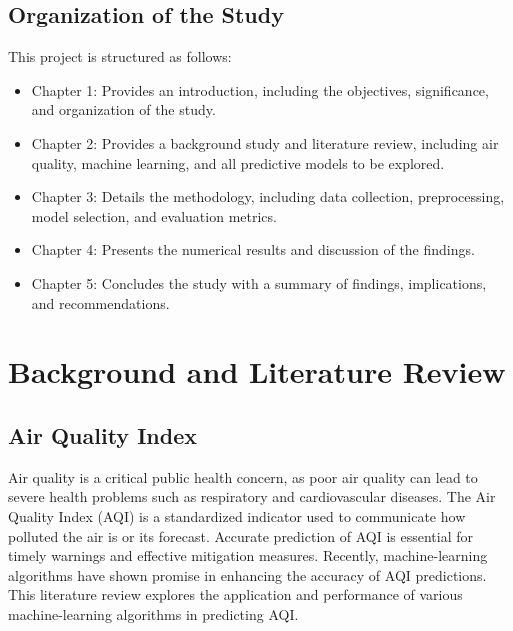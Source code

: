 \documentclass{book}
\numberwithin{equation}{section}
\numberwithin{figure}{section}
\begin{document}
\section{Organization of the Study}
\label{organization}
\vspace{-5mm} %
This project is structured as follows:
\begin{itemize}
    \item Chapter 1: Provides an introduction, including the objectives, significance, and organization of the study.
    \item Chapter 2: Provides a background study and literature review, including air quality, machine learning, and all predictive models to be explored.
    \item Chapter 3: Details the methodology, including data collection, preprocessing, model selection, and evaluation metrics.
    \item Chapter 4: Presents the numerical results and discussion of the findings.
    \item Chapter 5: Concludes the study with a summary of findings, implications, and recommendations.
\end{itemize}
\vspace{-5mm} %
\chapter{Background and Literature Review }
\vspace{-5mm} %
\section{Air Quality Index} 
\label{air quality}
\vspace{-5mm} %
Air quality is a critical public health concern, as poor air quality can lead to severe health problems such as respiratory and cardiovascular diseases. The Air Quality Index (AQI) is a standardized indicator used to communicate how polluted the air is or its forecast. Accurate prediction of AQI is essential for timely warnings and effective mitigation measures. Recently, machine-learning algorithms have shown promise in enhancing the accuracy of AQI predictions. This literature review explores the application and performance of various machine-learning algorithms in predicting AQI.
\end{document}
